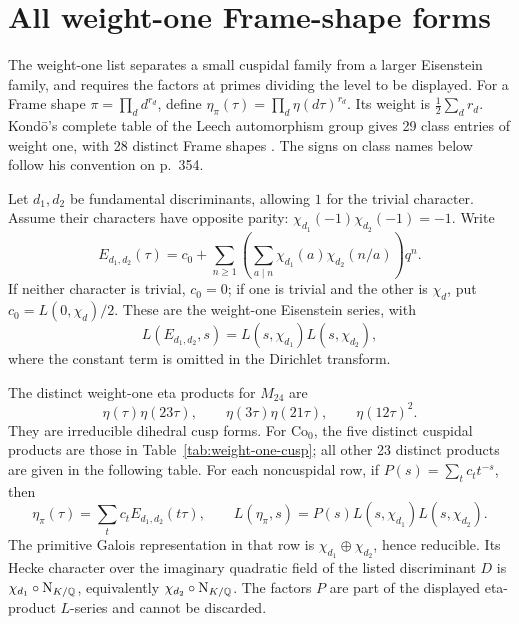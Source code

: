 \section{All weight-one Frame-shape forms}
The weight-one list separates a small cuspidal family from a larger
Eisenstein family, and requires the factors at primes dividing the
level to be displayed.
For a Frame shape \(\pi=\prod_d d^{r_d}\), define
\(\eta_\pi(\tau)=\prod_d\eta(d\tau)^{r_d}\). Its weight is
\(\tfrac12\sum_d r_d\).
Kond\=o's complete table of the Leech automorphism group gives
29 class entries of weight one, with 28 distinct Frame shapes
\cite[Table~I, pp.~355--357]{Kondo1985}.
The signs on class names below follow his convention on p.~354.

Let \(d_1,d_2\) be fundamental discriminants, allowing \(1\) for
the trivial character. Assume their characters have opposite parity:
\(\chi_{d_1}(-1)\chi_{d_2}(-1)=-1\). Write
\[
 E_{d_1,d_2}(\tau)=c_0+
 \sum_{n\ge1}\left(\sum_{a\mid n}
             \chi_{d_1}(a)\chi_{d_2}(n/a)\right)q^n.
\]
If neither character is trivial, \(c_0=0\); if one is trivial
and the other is \(\chi_d\), put \(c_0=L(0,\chi_d)/2\).
These are the weight-one Eisenstein series, with
\[
 L(E_{d_1,d_2},s)=L(s,\chi_{d_1})L(s,\chi_{d_2}),
\]
where the constant term is omitted in the Dirichlet transform.

\begin{theorem}\label{thm:weight-one-list}
The distinct weight-one eta products for \(M_{24}\) are
\[
 \eta(\tau)\eta(23\tau),\qquad
 \eta(3\tau)\eta(21\tau),\qquad
 \eta(12\tau)^2.
\]
They are irreducible dihedral cusp forms.
For \(\mathrm{Co}_0\), the five distinct cuspidal products are
those in Table~\ref{tab:weight-one-cusp}; all other 23 distinct
products are given in the following table.
For each noncuspidal row, if \(P(s)=\sum_t c_t t^{-s}\), then
\begin{equation}\label{eq:weight-one-eis}
 \eta_\pi(\tau)=\sum_t c_tE_{d_1,d_2}(t\tau),\qquad
 L(\eta_\pi,s)=P(s)L(s,\chi_{d_1})L(s,\chi_{d_2}).
\end{equation}
The primitive Galois representation in that row is
\(\chi_{d_1}\oplus\chi_{d_2}\), hence reducible.
Its Hecke character over the imaginary quadratic field of the
listed discriminant \(D\) is
\(\chi_{d_1}\circ\mathrm N_{K/\mathbb Q}\), equivalently
\(\chi_{d_2}\circ\mathrm N_{K/\mathbb Q}\).
The factors \(P\) are part of the displayed eta-product
\(L\)-series and cannot be discarded.
\end{theorem}

